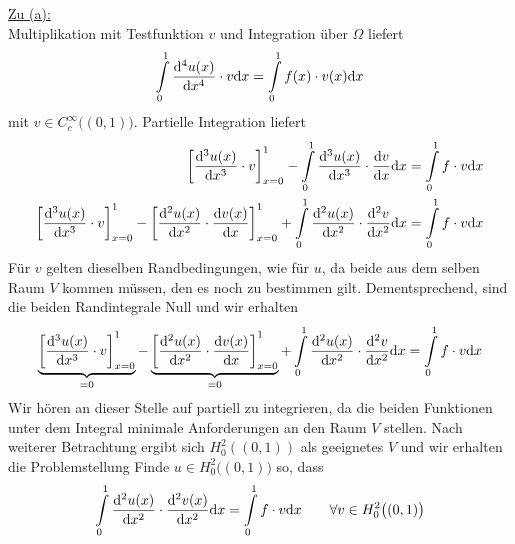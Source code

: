 \begin{lösung}
	\underline{Zu (a):}\\
	Multiplikation mit Testfunktion $v$ und Integration über $\Omega$ liefert
	\begin{align*}
		\int\limits_0^1 \frac{\mathrm{d}^4 u(x)}{\mathrm{d} x^4}\cdot v\mathrm{d} x=\int\limits_0^1 f(x)\cdot v(x)\mathrm{d} x
	\end{align*}
	mit $v\in C_c^\infty\big((0,1)\big)$. Partielle Integration liefert
	\begin{align*}
		\left[\frac{\mathrm{d}^3 u(x)}{\mathrm{d} x^3}\cdot v\right]_{x=0}^1
		-\int\limits_0^1 \frac{\mathrm{d}^3 u(x)}{\mathrm{d} x^3}\cdot\frac{\mathrm{d} v}{\mathrm{d} x}\mathrm{d} x=\int\limits_0^1 f\cdot v\mathrm{d} x\\
		\left[\frac{\mathrm{d}^3 u(x)}{\mathrm{d} x^3}\cdot v\right]_{x=0}^1 -
		\left[\frac{\mathrm{d}^2 u(x)}{\mathrm{d} x^2}\cdot \frac{\mathrm{d} v(x)}{\mathrm{d} x}\right]_{x=0}^1
		+\int\limits_0^1 \frac{\mathrm{d}^2 u(x)}{\mathrm{d} x^2}\cdot\frac{\mathrm{d}^2 v}{\mathrm{d} x^2}\mathrm{d} x=\int\limits_0^1 f\cdot v\mathrm{d} x\\
	\end{align*}
	Für $v$ gelten dieselben Randbedingungen, wie für $u$, da beide aus dem selben Raum $V$ kommen müssen, den es noch zu bestimmen gilt. 
	Dementsprechend, sind die beiden Randintegrale Null und wir erhalten
	\begin{align*}
		\underbrace{\left[\frac{\mathrm{d}^3 u(x)}{\mathrm{d} x^3}\cdot v\right]_{x=0}^1}_{=0} -
		\underbrace{\left[\frac{\mathrm{d}^2 u(x)}{\mathrm{d} x^2}\cdot \frac{\mathrm{d} v(x)}{\mathrm{d} x}\right]_{x=0}^1}_{=0}
		+\int\limits_0^1 \frac{\mathrm{d}^2 u(x)}{\mathrm{d} x^2}\cdot\frac{\mathrm{d}^2 v}{\mathrm{d} x^2}\mathrm{d} x=\int\limits_0^1 f\cdot v\mathrm{d} x\\
	\end{align*}
	Wir hören an dieser Stelle auf partiell zu integrieren, da die beiden Funktionen unter dem Integral minimale Anforderungen an den Raum $V$ stellen.
	Nach weiterer Betrachtung ergibt sich $H^2_0((0,1))$ als geeignetes $V$ und wir erhalten die Problemstellung\nl
	Finde $u\in H^2_0\big((0,1)\big)$ so, dass
	\begin{align*}
		\int\limits_0^1 \frac{\mathrm{d}^2 u(x)}{\mathrm{d} x^2}\cdot\frac{\mathrm{d}^2 v(x)}{\mathrm{d} x^2}\mathrm{d} x=\int\limits_0^1 f\cdot v\mathrm{d} x\qquad\forall v\in H_0^2\big((0,1)\big)
	\end{align*}


\end{lösung}
